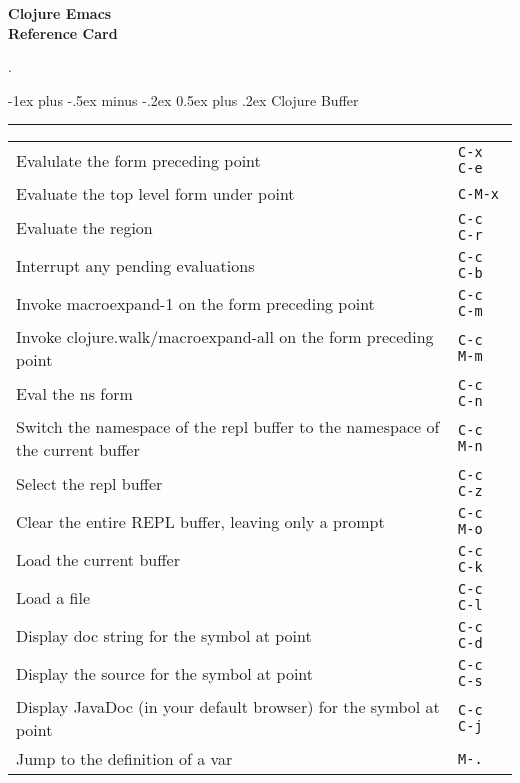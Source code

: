 \documentclass[12pt,landscape]{article}
\makeatletter
\renewcommand{\section}{\@startsection{section}{1}{0mm}%
                                {-1ex plus -.5ex minus -.2ex}%
                                {0.5ex plus .2ex}%
                                {\normalfont\large\bfseries}}
\makeatother
\begin{document}
\raggedright
\footnotesize
\begin{multicols}{3}


\setlength{\premulticols}{1pt}
\setlength{\postmulticols}{1pt}
\setlength{\multicolsep}{1pt}
\setlength{\columnsep}{2pt}

\begin{center}
     \Large{\textbf{Clojure Emacs \\ Reference Card}} \\
\end{center}.

\section{Clojure Buffer}\smallskip \hrule height 2pt \smallskip
\begin{tabular}{p{6cm}p{1cm}} %
	Evalulate the form preceding point    & \verb!C-x C-e!  \\
	Evaluate the top level form under point & \verb!C-M-x! \\
	Evaluate the region & \verb!C-c C-r! \\
	Interrupt any pending evaluations & \verb!C-c C-b! \\
	Invoke macroexpand-1 on the form preceding point & \verb!C-c C-m! \\
	Invoke clojure.walk/macroexpand-all on the form preceding point & \verb!C-c M-m! \\
	Eval the ns form & \verb!C-c C-n! \\
	Switch the namespace of the repl buffer to the namespace of the current buffer & \verb!C-c M-n! \\
	Select the repl buffer & \verb!C-c C-z! \\
	Clear the entire REPL buffer, leaving only a prompt & \verb!C-c M-o! \\
	Load the current buffer & \verb!C-c C-k! \\
	Load a file & \verb!C-c C-l! \\
	Display doc string for the symbol at point & \verb!C-c C-d! \\
	Display the source for the symbol at point & \verb!C-c C-s! \\
	Display JavaDoc (in your default browser) for the symbol at point & \verb!C-c C-j! \\
	Jump to the definition of a var & \verb!M-.! \\

\end{tabular}
\end{multicols}
\end{document}
